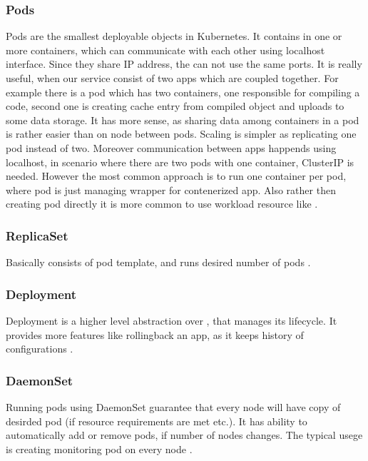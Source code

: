 \subsubsection{Pods}
\label{sec:pods}

Pods are the smallest deployable objects in Kubernetes. It contains in one or more containers, which can communicate with each other using localhost interface. Since they share IP address, the can not use the same ports. It is really useful, when our service consist of two apps which are coupled together. For example there is a pod which has two containers, one responsible for compiling a code, second one is creating cache entry from compiled object and uploads to some data storage. It has more sense, as sharing data among containers in a pod is rather easier than on node between pods. Scaling is simpler as replicating one pod instead of two. Moreover communication between apps happends using localhost, in scenario where there are two pods with one container, ClusterIP \textit{} is needed. However the most common approach is to run one container per pod, where pod is just managing wrapper for contenerized app. Also rather then creating pod directly it is more common to use workload resource like \textit{} \cite{KubernetesPods}.

\subsubsection{ReplicaSet}
\label{replicaset}

Basically \textit{} consists of pod template, and runs desired number of pods \cite{KubernetesReplicaSet}.

\subsubsection{Deployment}
\label{deployment}

Deployment is a higher level abstraction over \textit{}, that manages its lifecycle. It provides more features like rollingback an app, as it keeps history of configurations \cite{KubernetesDeployments}.

\subsubsection{DaemonSet}
\label{daemonset}

Running pods using DaemonSet guarantee that every node will have copy of desirded pod (if resource requirements are met etc.). It has ability to automatically add or remove pods, if number of nodes changes. The typical usege is creating monitoring pod on every node \cite{KubernetesDaemonSet}.


